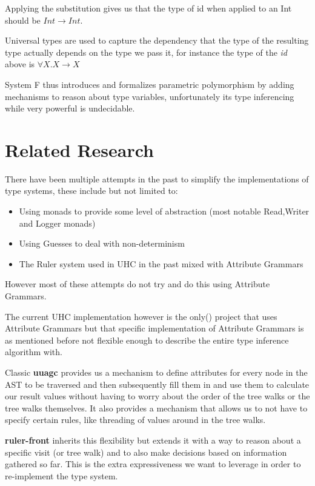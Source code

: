 Applying the substitution gives us that the type of id when applied to an Int should be $Int \rightarrow Int$.

Universal types are used to capture the dependency that the type of the resulting type actually depends on the type we pass it, for instance the type of the \textit{id} above is $\forall X. X\rightarrow X$

System F thus introduces and formalizes parametric polymorphism by adding mechanisms to reason about type variables, unfortunately its type inferencing   while very powerful is undecidable.

\section{Related Research}
There have been multiple attempts in the past to simplify the implementations of type systems, these include but not limited to:

\begin{itemize}
\item Using monads\cite{Monads} to provide some level of abstraction (most notable Read,Writer and Logger monads)
\item Using Guesses\cite{Guesses} to deal with non-determinism
\item The Ruler\cite{Ruler} system used in UHC in the past mixed with Attribute Grammars
\end{itemize}

However most of these attempts do not try and do this using Attribute Grammars.

The current UHC implementation however is the only(\cite{UHC}) project that uses Attribute Grammars but that specific implementation of Attribute Grammars is as mentioned before not flexible enough to describe the entire type inference algorithm with.

Classic \textbf{uuagc} provides us a mechanism to define attributes for every node in the AST to be traversed and then subsequently fill them in and use them to calculate our result values without having to worry about the order of the tree walks or the tree walks themselves. It also provides a mechanism that allows us to not have to specify certain rules, like threading of values around in the tree walks.

\textbf{ruler-front} inherits this flexibility but extends it with a way to reason about a specific visit (or tree walk) and to also make decisions based on information gathered so far. This is the extra expressiveness we want to leverage in order to re-implement the type system.

